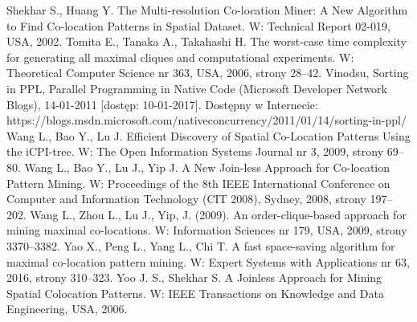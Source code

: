 \documentclass[12pt]{article}
\begin{document}
\begin{thebibliography}{}
Shekhar S., Huang Y. The Multi-resolution Co-location Miner: A New Algorithm to Find Co-location Patterns in Spatial Dataset. W: Technical Report 02-019, USA, 2002.
Tomita E., Tanaka A., Takahashi H. The worst-case time complexity for generating all maximal cliques and computational experiments. W: Theoretical Computer Science nr 363, USA, 2006, strony 28–42.
Vinodsu, Sorting in PPL, Parallel Programming in Native Code (Microsoft Developer Network Blogs), 14-01-2011 [dostęp: 10-01-2017]. Dostępny w Internecie: https://blogs.msdn.microsoft.com/nativeconcurrency/2011/01/14/sorting-in-ppl/
Wang L., Bao Y., Lu J. Efficient Discovery of Spatial Co-Location Patterns Using the iCPI-tree. W: The Open Information Systems Journal nr 3, 2009, strony 69–80.
Wang L., Bao Y., Lu J., Yip J. A New Join-less Approach for Co-location Pattern Mining. W: Proceedings of the 8th IEEE International Conference on Computer and Information Technology (CIT 2008), Sydney, 2008, strony 197–202.
Wang L., Zhou L., Lu J., Yip, J. (2009). An order-clique-based approach for mining maximal co-locations. W: Information Sciences nr 179, USA, 2009, strony 3370–3382.
Yao X., Peng L., Yang L., Chi T. A fast space-saving algorithm for maximal co-location pattern mining. W: Expert Systems with Applications nr 63, 2016, strony 310–323.
Yoo J. S., Shekhar S. A Joinless Approach for Mining Spatial Colocation Patterns. W: IEEE Transactions on Knowledge and Data Engineering, USA, 2006.
\end{thebibliography}
\end{document}
